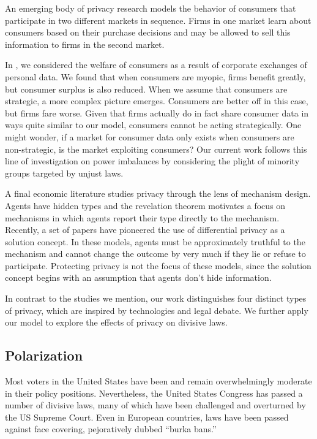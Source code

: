 An emerging body of privacy research models the behavior of consumers that participate in two different markets in sequence.  Firms in one market learn about consumers based on their purchase decisions and may be allowed to sell this information to firms in the second market.

In  \cite{johnsoncaviar}, we considered the welfare of consumers as a result of corporate exchanges of personal data.  We found that when consumers are myopic, firms benefit greatly, but consumer surplus is also reduced. When we assume that consumers are strategic, a more complex picture emerges. Consumers are better off in this case, but firms fare worse.  Given that firms actually do in fact share consumer data in ways quite similar to our model, consumers cannot be acting strategically.  One might wonder, if a market for consumer data only exists when consumers are non-strategic, is the market exploiting consumers?  Our current work follows this line of investigation on power imbalances by considering the plight of minority groups targeted by unjust laws.

A final economic literature studies privacy through the lens of mechanism design.  Agents have hidden types and the revelation theorem motivates a focus on mechanisms in which agents report their type directly to the mechanism.  Recently, a set of papers have pioneered the use of differential privacy as a solution concept.  In these models, agents must be approximately truthful to the mechanism and cannot change the outcome by very much if they lie or refuse to participate.  Protecting privacy is not the focus of these models, since the solution concept begins with an assumption that agents don't hide information.

In contrast to the studies we mention, our work distinguishes four distinct types of privacy, which are inspired by technologies and legal debate.  We further apply our model to explore the effects of privacy on divisive laws.

\subsection{Polarization}
Most voters in the United States have been and remain overwhelmingly moderate in their policy positions\cite{layman2006party}. Nevertheless, the United States Congress has passed a number of divisive laws, many of which have been challenged and overturned by the US Supreme Court.  Even in European countries, laws have been passed %
against face covering, pejoratively dubbed ``burka bans.''

